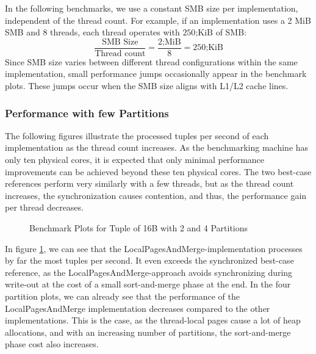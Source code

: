 In the following benchmarks, we use a constant \ac{SMB} size per implementation, independent of the thread count.
For example, if an implementation uses a 2 MiB \ac{SMB} and 8 threads, each thread operates with $250 \textrm{;KiB}$ of \ac{SMB}:
\begin{equation}
  \frac{\textrm{SMB Size}} {\textrm{Thread count}} = \frac{2 \textrm{;MiB}}{8} = 250 \textrm{;KiB}
\end{equation}
Since \ac{SMB} size varies between different thread configurations within the same implementation, small performance jumps occasionally appear in the benchmark plots.
These jumps occur when the \ac{SMB} size aligns with L1/L2 cache lines.

\subsubsection{Performance with few Partitions}
The following figures illustrate the processed tuples per second of each implementation as the thread count increases.
As the benchmarking machine has only ten physical cores, it is expected that only minimal performance improvements can be achieved beyond these ten physical cores.
The two best-case references perform very similarly with a few threads, but as the thread count increases, the synchronization causes contention, and thus, the performance gain per thread decreases.

\begin{figure}[h]
  \centering
  \begin{subfigure}{.49\textwidth}
    \centering
    \resizebox{\linewidth}{!}{}
  \end{subfigure}
  \begin{subfigure}{.49\textwidth}
    \centering
    \resizebox{\linewidth}{!}{}
  \end{subfigure}
  \begin{subfigure}{\textwidth}
    \centering
    \resizebox{\linewidth}{!}{}
  \end{subfigure}
  \caption[Shuffle Benchmark Plots for Tuple of 16B with 2 and 4 Partitions]{Benchmark Plots for Tuple of 16B with 2 and 4 Partitions}
  \label{plot-shuffle-16B-2-4}
\end{figure}
In figure \ref{plot-shuffle-16B-2-4}, we can see that the LocalPagesAndMerge-implementation processes by far the most tuples per second.
It even exceeds the synchronized best-case reference, as the LocalPagesAndMerge-approach avoids synchronizing during write-out at the cost of a small sort-and-merge phase at the end.
In the four partition plots, we can already see that the performance of the LocalPagesAndMerge implementation decreases compared to the other implementations.
This is the case, as the thread-local pages cause a lot of heap allocations, and with an increasing number of partitions, the sort-and-merge phase cost also increases.

